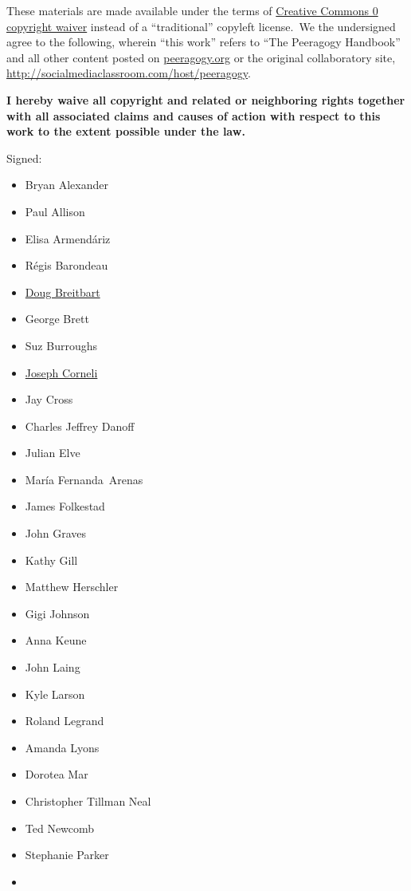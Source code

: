 These materials are made available under the terms of
\href{http://creativecommons.org/publicdomain/zero/1.0/}{Creative
Commons 0 copyright waiver} instead of a ``traditional'' copyleft
license.~We the undersigned agree to the following, wherein ``this
work'' refers to ``The Peeragogy Handbook'' and all other content posted
on \href{http://peeragogy.org}{peeragogy.org} or the original
collaboratory site,
\url{http://socialmediaclassroom.com/host/peeragogy}.

\textbf{I hereby waive all copyright and related or neighboring rights
together with all associated claims and causes of action with respect to
this work to the extent possible under the law.}

Signed:

\begin{itemize}
\itemsep1pt\parskip0pt
\item
  Bryan Alexander
\item
  Paul Allison
\item
  Elisa Armendáriz
\item
  Régis Barondeau
\item
  \href{https://www.linkedin.com/in/dougbreitbart}{Doug Breitbart}
\item
  George Brett
\item
  Suz Burroughs
\item
  \href{http://metameso.org/~joe}{Joseph Corneli}
\item
  Jay Cross
\item
  Charles Jeffrey Danoff
\item
  Julian Elve
\item
  María Fernanda~Arenas
\item
  James Folkestad
\item
  John Graves
\item
  Kathy Gill
\item
  Matthew Herschler
\item
  Gigi Johnson
\item
  Anna Keune
\item
  John Laing
\item
  Kyle Larson
\item
  Roland Legrand
\item
  Amanda Lyons
\item
  Dorotea Mar
\item
  Christopher Tillman Neal
\item
  Ted Newcomb
\item
  Stephanie Parker
\item

\end{itemize}
